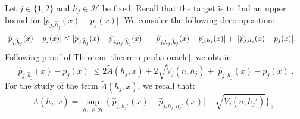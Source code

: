 \documentclass[11pt,a4paper,openany]{article}
\begin{document}
Let $j \in \{1,2\}$ and $h_{j} \in \mathcal{H}$ be fixed. Recall that the target is to find an upper bound for $\big| \widehat{p}_{j,\widehat{h}_{j}}(x)  -  p_{j}(x) \big|$. We consider the following decomposition:
	\begin{align*}
		\big| \widehat{p}_{j,\widehat{h}_{j}}(x)  -  p_{j}(x) \big|   \leq   { \big| \widehat{p}_{j,\widehat{h}_{j}}(x)  -  \widehat{p}_{j, h_{j} ,\widehat{h}_{j}}(x) \big| } &+   {\big| \widehat{p}_{j, h_{j} ,\widehat{h}_{j}}(x)  -  \widehat{p}_{j, h_{j}}(x) \big|}  
		+  \hspace{0.1cm}   \big|  \widehat{p}_{j, h_{j}}(x)  -  p_{j}(x) \big| .
	\end{align*}
		Following proof of  Theorem \ref{theorem-proba-oracle}, we obtain
	\begin{equation} \label{adaptive:thm:upper-bound.high-Proba:p2:proof:inequality1}
		\big| \widehat{p}_{j,\widehat{h}_{j}}(x)  -  p_{j}(x) \big|   \leq   2  \widetilde A(h_{j} , x)  +   2 \sqrt{\widetilde{V}_{j}(n,h_{j})}  +   \big|  \widehat{p}_{j, h_{j}}(x)  -  p_{j}(x) \big| .
	\end{equation}
	For the  study of the term $\widetilde A(h_{j} , x)$, we recall that:
	$$
	\widetilde 	A(h_{j} , x) 
		= \sup_{h_{j}' \in \mathcal{H}}  \Big\{ \big| \widehat{p}_{j,h_{j}'}(x)  -  \widehat{p}_{j, h_{j} ,h_{j}'}(x) \big| -   \sqrt{\widetilde{V}_{j}(n,h_{j}')} \Big\}_{+} .
	$$
\end{document}
